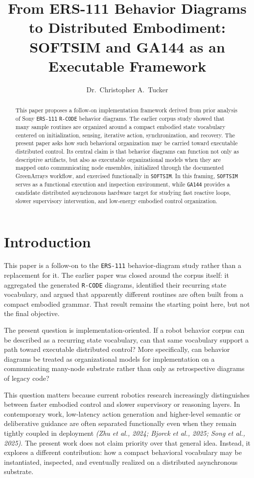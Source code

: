 \documentclass[11pt]{article}
\title{From ERS-111 Behavior Diagrams to Distributed Embodiment:\\SOFTSIM and GA144 as an Executable Framework}
\author{Dr.\ Christopher A.\ Tucker}
\date{}
\begin{document}
\maketitle

\begin{abstract}
This paper proposes a follow-on implementation framework derived from
prior analysis of Sony \texttt{ERS-111} \texttt{R-CODE} behavior
diagrams. The earlier corpus study showed that many sample routines are
organized around a compact embodied state vocabulary centered on
initialization, sensing, iterative action, synchronization, and
recovery. The present paper asks how such behavioral organization may
be carried toward executable distributed control. Its central claim is
that behavior diagrams can function not only as descriptive artifacts,
but also as executable organizational models when they are mapped onto
communicating node ensembles, initialized through the documented
GreenArrays workflow, and exercised functionally in \texttt{SOFTSIM}.
In this framing, \texttt{SOFTSIM} serves as a functional execution and
inspection environment, while \texttt{GA144} provides a candidate
distributed asynchronous hardware target for studying fast reactive
loops, slower supervisory intervention, and low-energy embodied control
organization.
\end{abstract}

\section*{Introduction}

This paper is a follow-on to the \texttt{ERS-111} behavior-diagram
study rather than a replacement for it. The earlier paper was closed
around the corpus itself: it aggregated the generated
\texttt{R-CODE} diagrams, identified their recurring state vocabulary,
and argued that apparently different routines are often built from a
compact embodied grammar. That result remains the starting point here,
but not the final objective.

The present question is implementation-oriented. If a robot behavior
corpus can be described as a recurring state vocabulary, can that same
vocabulary support a path toward executable distributed control? More
specifically, can behavior diagrams be treated as organizational models
for implementation on a communicating many-node substrate rather than
only as retrospective diagrams of legacy code?

This question matters because current robotics research increasingly
distinguishes between faster embodied control and slower supervisory or
reasoning layers. In contemporary work, low-latency action generation
and higher-level semantic or deliberative guidance are often separated
functionally even when they remain tightly coupled in deployment
\textit{(Zhu et al., 2024; Bjorck et al., 2025; Song et al., 2025)}.
The present work does not claim priority over that general idea.
Instead, it explores a different contribution: how a compact
behavioral vocabulary may be instantiated, inspected, and eventually
realized on a distributed asynchronous substrate.
\end{document}
